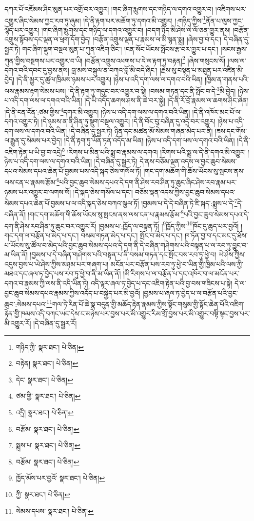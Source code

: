 དཀར་པོ་འཇོམས་ཤིང་མུན་པར་འགྲོ་བར་འགྱུར། །གང་ཞིག་རྨུགས་དང་གཉིད་ལ་དགའ་འགྱུར་བ། །འཇིགས་པར་འགྱུར་ཞིང་སེམས་ཀྱང་རབ་ཏུ་ཞུམ། །དེ་ནི་རྟག་པར་མཆོག་ཏུ་དགའ་མི་འགྱུར། །:གཉིད་ཀྱིས་\footnote{གཉིད་ཀྱི་  སྣར་ཐང་།  པེ་ཅིན། }ནོན་པ་ལུས་ཀྱང་ལྷོད་པར་འགྱུར། །གང་ཞིག་རྨུགས་དང་གཉིད་ལ་དགའ་འགྱུར་བ། །བདག་ཉིད་མི་ཤེས་ལེ་ལོ་ཅན་གྱུར་ནས། །བརྩོན་འགྲུས་སྟོབས་དང་ལྡན་ལ་ཕྲག་དོག་བྱེད། །བརྩོན་འགྲུས་ལྡན་པ་རྣམས་ལ་མི་སྙན་སྨྲ། །ཞེས་བྱ་བ་དང་། དེ་བཞིན་དུ་སྦྱར་ཏེ། གང་ཞིག་སྡུག་བསྔལ་མུན་པ་ཀུན་འཇིག་ཅིང་། །ངན་སོང་ཡོངས་སྤོངས་རྩ་བར་གྱུར་པ་དང་། །སངས་རྒྱས་ཀུན་གྱིས་བསྔགས་པར་འགྱུར་བ་ཡི། །བརྩོན་འགྲུས་འཕགས་པ་དེ་ལ་རྟག་ཏུ་བརྟན།\footnote{བརྟེན།  སྣར་ཐང་།  པེ་ཅིན། } །ཞེས་གསུངས་སོ། །ལས་ལ་དགའ་བའི་དབང་དུ་བྱས་ནས། བླ་མས་བསྐུལ་ན་བཀའ་བློ་མི་བདེ་ཞིང་། །རྗེས་སུ་བསྟན་པ་མཐུན་པར་འཛིན་མི་བྱེད། །དེ་ནི་མྱུར་དུ་ཚུལ་ཁྲིམས་ཉམས་པར་འགྱུར། །ཉེས་པ་འདི་དག་ལས་ལ་དགའ་བའི་ཡིན། །ཁྱིམ་ན་གནས་པའི་ལས་རྣམས་རྟག་སེམས་པས། །དེ་ནི་རྟག་ཏུ་གདུང་བར་འགྱུར་བ་སྟེ། །བསམ་གཏན་དང་ནི་སྤོང་བ་དེ་\footnote{དེང་  སྣར་ཐང་།  པེ་ཅིན། }མི་བྱེད། །ཉེས་པ་འདི་དག་ལས་ལ་དགའ་བའི་ཡིན། །དེ་ཡི་འདོད་ཆགས་ཤས་ནི་ཆེ་བར་སྐྱེ། །དེ་ནི་རོ་བྲོ་རྣམས་ལ་ཆགས་ཤིང་ཞེན། །དེ་ནི་ངན་ངོན་:ཙམ་གྱིས་\footnote{ཙམ་གྱི་  སྣར་ཐང་།  པེ་ཅིན། }དགར་མི་འགྱུར། །ཉེས་པ་འདི་དག་ལས་ལ་དགའ་བའི་ཡིན། །དེ་ནི་འཁོར་མང་པོ་ལ་དགའ་འགྱུར་ཏེ། །དེ་ཉམས་ན་ནི་ཤིན་ཏུ་སྡུག་བསྔལ་འགྱུར། །དེ་ནི་བོང་བུ་བཞིན་དུ་འདྲེ་བར་འགྱུར། །ཉེས་པ་འདི་དག་ལས་ལ་དགའ་བའི་ཡིན། །དེ་བཞིན་དུ་སྦྱར་ཏེ། ཉིན་དང་མཚན་མོ་སེམས་གཞན་མེད་པར་ནི། །ཟས་དང་གོས་ལ་རྒྱུན་དུ་སེམས་པར་བྱེད། །དེ་ནི་རྟག་ཏུ་ཡོན་ཏན་འདོད་མ་ཡིན། །ཉེས་པ་འདི་དག་ལས་ལ་དགའ་བའི་ཡིན། །དེ་ནི་འཇིག་རྟེན་པ་ཡི་བྱ་བ་འདྲེ།\footnote{འདྲི།  སྣར་ཐང་།  པེ་ཅིན། } །རིགས་པ་མིན་པའི་སྨྲ་བ་རྣམས་ལ་དགའ། །རིགས་པའི་སྨྲ་ལ་དེ་ནི་དགའ་མི་འགྱུར། །ཉེས་པ་འདི་དག་ལས་ལ་དགའ་བའི་ཡིན། །དེ་བཞིན་དུ་སྦྱར་ཏེ། དེ་ནས་བཅོམ་ལྡན་འདས་ལ་བྱང་ཆུབ་སེམས་དཔའ་སེམས་དཔའ་ཆེན་པོ་བྱམས་པས་འདི་སྐད་ཅེས་གསོལ་ཏོ། །གང་དག་མཆོག་གི་ཆོས་ཡོངས་སུ་སྤངས་ནས་ལས་ངན་པ་རྣམས་རྩོམ་\footnote{བརྩོམ་  སྣར་ཐང་།  པེ་ཅིན། }པའི་བྱང་ཆུབ་སེམས་དཔའ་དེ་དག་ནི་ཤེས་རབ་ཤིན་ཏུ་ཆུང་ཞིང་ཤེས་རབ་རྣམ་པར་ཉམས་པར་འགྱུར་བ་ལགས་སོ། །དེ་སྐད་ཅེས་གསོལ་པ་དང་། བཅོམ་ལྡན་འདས་ཀྱིས་བྱང་ཆུབ་སེམས་དཔའ་སེམས་དཔའ་ཆེན་པོ་བྱམས་པ་ལ་འདི་སྐད་ཅེས་བཀའ་སྩལ་ཏོ། །བྱམས་པ་དེ་དེ་བཞིན་ཏེ་ཇི་སྐད་:སྨྲས་པ་དེ་\footnote{སྨྲས་པ་  སྣར་ཐང་།  པེ་ཅིན། }དེ་བཞིན་ནོ། །གང་དག་མཆོག་གི་ཆོས་ཡོངས་སུ་སྤངས་ནས་ལས་ངན་པ་རྣམས་རྩོམ་\footnote{བརྩོམ་  སྣར་ཐང་།  པེ་ཅིན། }པའི་བྱང་ཆུབ་སེམས་དཔའ་དེ་དག་ནི་ཤེས་རབ་ཤིན་ཏུ་ཆུང་བར་འགྱུར་རོ། །བྱམས་པ་:ཁྱོད་ལ་བསྟན་ཏོ། །\footnote{ཁྱོད་མོས་པར་བྱའོ་  སྣར་ཐང་།  པེ་ཅིན། }ཁྱོད་ཀྱིས་\footnote{ཀྱི་  སྣར་ཐང་།  པེ་ཅིན། }ཁོང་དུ་ཆུད་པར་བྱའོ། །གང་དག་ལ་བརྩོན་པ་མེད་པ་དང་། བསམ་གཏན་མེད་པ་དང་། སྤོང་བ་མེད་པ་དང་། ཁ་ཏོན་བྱ་བ་དང་མང་དུ་ཐོས་པ་ཡོངས་སུ་ཚོལ་བ་མེད་པའི་བྱང་ཆུབ་སེམས་དཔའ་དེ་དག་ནི་དེ་བཞིན་གཤེགས་པའི་བསྟན་པ་ལ་རབ་ཏུ་བྱུང་བ་མ་ཡིན་ནོ། །བྱམས་པ་དེ་བཞིན་གཤེགས་པའི་བསྟན་པ་ནི་བསམ་གཏན་དང་སྤོང་བས་རབ་ཏུ་ཕྱེ་བ། ཡེ་ཤེས་ཀྱིས་འདུས་བྱས་པ་ཡེ་ཤེས་ཀྱིས་མཉམ་པར་གཞག་པ། མངོན་པར་བརྩོན་པས་རབ་ཏུ་ཕྱེ་བ་ཡིན་གྱི་ཁྱིམ་པའི་ལས་ཀྱི་མཐའ་དང་ཞལ་ཏ་བྱེད་པས་རབ་ཏུ་ཕྱེ་བ་ནི་མ་ཡིན་ནོ། །མི་རིགས་པ་ལ་བརྩོན་པ་དང་འཁོར་བ་ལ་མངོན་པར་དགའ་བ་རྣམས་ཀྱི་ལས་ནི་འདི་ཡིན་ཏེ། འདི་ལྟར་ཞལ་ཏ་བྱེད་པ་དང་འཇིག་རྟེན་པའི་བྱ་བས་གཟིངས་པ་སྟེ། དེ་ལ་བྱང་ཆུབ་སེམས་དཔའ་རྣམས་ཀྱིས་འདོད་པ་བསྐྱེད་པར་མི་བྱའོ། །བྱམས་པ་ཞལ་ཏ་བྱེད་པ་ལ་བརྩོན་པའི་བྱང་ཆུབ་:སེམས་དཔའ་\footnote{སེམས་དཔས་  སྣར་ཐང་།  པེ་ཅིན། }གལ་ཏེ་རིན་པོ་ཆེ་སྣ་བདུན་གྱི་མཆོད་རྟེན་རྣམས་ཀྱིས་སྟོང་གསུམ་གྱི་སྟོང་ཆེན་པོའི་འཇིག་རྟེན་གྱི་ཁམས་འདི་བཀང་ཡང་དེས་ང་མཉེས་པར་བྱས་པར་མི་འགྱུར་རིམ་གྲོ་བྱས་པར་མི་འགྱུར་བསྟི་སྟང་བྱས་པར་མི་འགྱུར་རོ། །དེ་བཞིན་དུ་སྦྱར་རོ། 